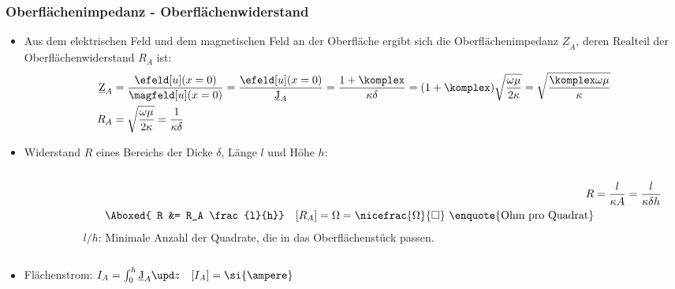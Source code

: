 \begin{frame}
   \frametitle{Oberflächenimpedanz - Oberflächenwiderstand}
\begin{itemize}[<+->]
    \item Aus dem elektrischen Feld und dem magnetischen Feld an der Oberfläche ergibt sich die \alert{Oberflächenimpedanz} $\underbar{Z}_A$, deren Realteil der \alert{Oberflächenwiderstand} $R_A$ ist:
\begin{align*}
        \underbar{Z}_A &= \frac{ \efeld[u](x=0)}{\magfeld[u](x=0)} = \frac{ \efeld[u](x=0)}{ \underbar{J}_A } = \frac{1+\komplex}{\kappa\delta} = (1+\komplex) \sqrt{\frac{\omega\mu}{2\kappa}} = \sqrt{\frac{\komplex \omega \mu}{\kappa}}\\
        R_A &= \sqrt{\frac{\omega\mu}{2\kappa}} = \frac{1}{\kappa\delta}
     \end{align*}
     \item \alert{Widerstand} $R$ eines Bereichs der Dicke $\delta$, Länge $l$ und Höhe $h$:
\begin{columns}
    \begin{column}{.3\linewidth}
    \end{column}
    \begin{column}{.7\linewidth}
       \begin{align*}
         R &= \frac{l}{\kappa A} = \frac{l}{\kappa \delta h}\\
        \Aboxed{ R &= R_A \frac{l}{h}} \quad [R_A] = \Omega = \nicefrac{\Omega}{\Box} \text{ \enquote{Ohm pro Quadrat}}
       \end{align*}
      $l/h$: Minimale Anzahl der Quadrate, die in das Oberflächenstück passen.
     \end{column}
 \end{columns}  
     \item \alert{Flächenstrom}: $I_A=\int_0^h \underbar{J}_A  \upd z \quad [I_A] = \si{\ampere}$
 \end{itemize}
\end{frame}

